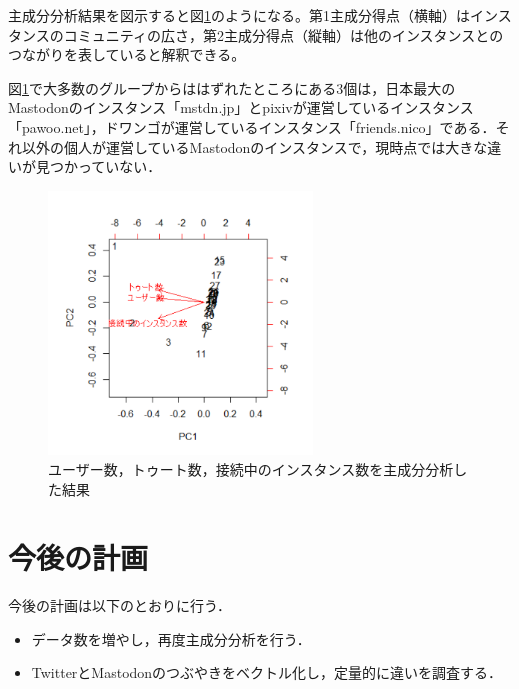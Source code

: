 \documentclass[uplatex,twocolumn,dvipdfmx]{jsarticle}
\begin{document}
主成分分析結果を図示すると図\ref{R}のようになる。第1主成分得点（横軸）はインスタンスのコミュニティの広さ，第2主成分得点（縦軸）は他のインスタンスとのつながりを表していると解釈できる。

図\ref{R}で大多数のグループからははずれたところにある$3$個は，日本最大のMastodonのインスタンス「mstdn.jp」とpixivが運営しているインスタンス「pawoo.net」，ドワンゴが運営しているインスタンス「friends.nico」である．それ以外の個人が運営しているMastodonのインスタンスで，現時点では大きな違いが見つかっていない．
\begin{figure}[h]
\centering
\includegraphics[width=7cm,clip]{R1.pdf}
\caption{ユーザー数，トゥート数，接続中のインスタンス数を主成分分析した結果}\label{R}
\end{figure}

\section{今後の計画}
今後の計画は以下のとおりに行う．
\begin{itemize}
\item データ数を増やし，再度主成分分析を行う．

\item TwitterとMastodonのつぶやきをベクトル化し，定量的に違いを調査する．
\end{itemize}


\end{document}
